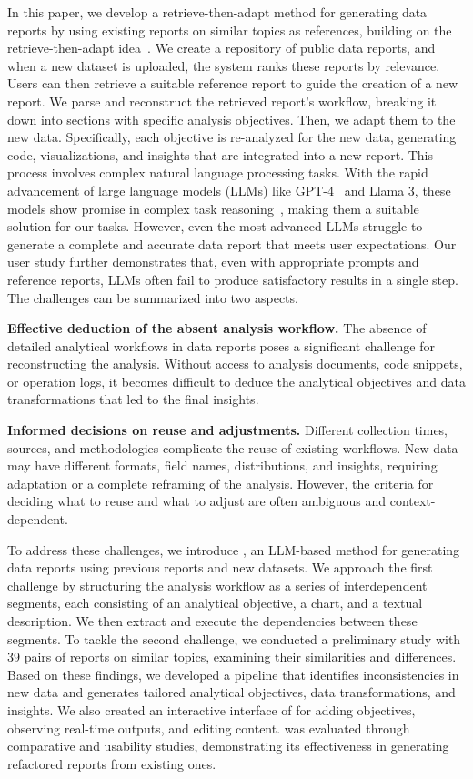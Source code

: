 In this paper, we develop a retrieve-then-adapt method for generating data reports by using existing reports on similar topics as references, building on the retrieve-then-adapt idea~\cite{qian2020retrieve}. 
We create a repository of public data reports, and when a new dataset is uploaded, the system ranks these reports by relevance. 
Users can then retrieve a suitable reference report to guide the creation of a new report.
We parse and reconstruct the retrieved report's workflow, breaking it down into sections with specific analysis objectives. 
Then, we adapt them to the new data. Specifically, each objective is re-analyzed for the new data, generating code, visualizations, and insights that are integrated into a new report. 
This process involves complex natural language processing tasks.
With the rapid advancement of large language models (LLMs) like GPT-4~\cite{openai2023gpt4} and Llama 3, these models show promise in complex task reasoning~\cite{suh2023Sensecape, wang2023dataFormulator, lin2023inksight}, making them a suitable solution for our tasks. 
However, even the most advanced LLMs struggle to generate a complete and accurate data report that meets user expectations. 
Our user study further demonstrates that, even with appropriate prompts and reference reports, LLMs often fail to produce satisfactory results in a single step.
The challenges can be summarized into two aspects.

\textbf{Effective deduction of the absent analysis workflow. }
The absence of detailed analytical workflows in data reports poses a significant challenge for reconstructing the analysis. Without access to analysis documents, code snippets, or operation logs, it becomes difficult to deduce the analytical objectives and data transformations that led to the final insights.

\textbf{Informed decisions on reuse and adjustments. }
Different collection times, sources, and methodologies complicate the reuse of existing workflows. New data may have different formats, field names, distributions, and insights, requiring adaptation or a complete reframing of the analysis. However, the criteria for deciding what to reuse and what to adjust are often ambiguous and context-dependent.

To address these challenges, we introduce \system{}, an LLM-based method for generating data reports using previous reports and new datasets. 
We approach the first challenge by structuring the analysis workflow as a series of interdependent segments, each consisting of an analytical objective, a chart, and a textual description. We then extract and execute the dependencies between these segments.
To tackle the second challenge, we conducted a preliminary study with 39 pairs of reports on similar topics, examining their similarities and differences. Based on these findings, we developed a pipeline that identifies inconsistencies in new data and generates tailored analytical objectives, data transformations, and insights. 
We also created an interactive interface of \system{} for adding objectives, observing real-time outputs, and editing content. \system{} was evaluated through comparative and usability studies, demonstrating its effectiveness in generating refactored reports from existing ones.

